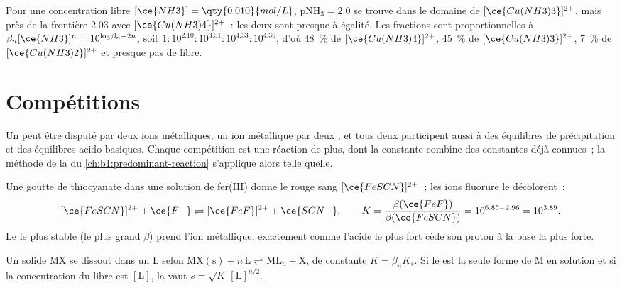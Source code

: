 \begin{example}\label{ex:b1:complexation:cu}
Pour une concentration libre $[\ce{NH3}] = \qty{0.010}{mol/L}$, $\mathrm{pNH_3} = 2.0$
se trouve dans le domaine de $[\ce{Cu(NH3)3}]^{2+}$, mais près de la
frontière 2.03 avec $[\ce{Cu(NH3)4}]^{2+}$~: les deux  sont
presque à égalité. Les fractions sont proportionnelles à
$\beta_n[\ce{NH3}]^n = 10^{\log\beta_n - 2n}$, soit
$1 : 10^{2.10} : 10^{3.51} : 10^{4.33} : 10^{4.36}$, d'où
\qty{48}{\percent} de
$[\ce{Cu(NH3)4}]^{2+}$, \qty{45}{\percent} de $[\ce{Cu(NH3)3}]^{2+}$,
\qty{7}{\percent} de $[\ce{Cu(NH3)2}]^{2+}$ et presque pas de 
libre.
\end{example}

\section{Compétitions}

Un  peut être disputé par deux ions métalliques, un ion métallique
par deux , et tous deux participent aussi à des équilibres de
précipitation et des équilibres acido-basiques. Chaque compétition est
une réaction de plus, dont la constante combine des constantes déjà
connues~; la méthode de la  du
\cref{ch:b1:predominant-reaction} s'applique alors telle quelle.

\begin{example}\label{ex:b1:complexation:scn-f}
Une goutte de thiocyanate dans une solution de fer(III) donne le 
rouge sang $[\ce{FeSCN}]^{2+}$~; les ions fluorure le décolorent~:
\[
  [\ce{FeSCN}]^{2+} + \ce{F-} \rightleftharpoons [\ce{FeF}]^{2+} + \ce{SCN-},
  \qquad K = \frac{\beta(\ce{FeF})}{\beta(\ce{FeSCN})} = 10^{6.85 - 2.96} =
  10^{3.89} .
\]
Le  le plus stable (le plus grand $\beta$) prend l'ion
métallique, exactement comme l'acide le plus fort cède son proton à la
base la plus forte.
\end{example}

\begin{proposition}\label{prop:b1:complexation:competition-precipitation}
Un solide MX se dissout dans un  L selon
$\mathrm{MX(s)} + n\,\mathrm{L} \rightleftharpoons \mathrm{ML}_n + \mathrm{X}$,
de constante $K = \beta_n K_s$. Si le  est la seule forme de M en
solution et si la concentration du  libre est $[\mathrm{L}]$, la
 vaut $s = \sqrt{K}\,[\mathrm{L}]^{n/2}$.
\end{proposition}

